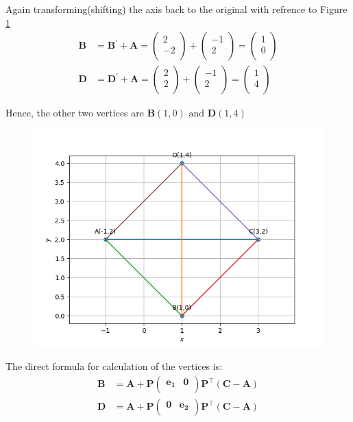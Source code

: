 \documentclass[12pt]{article}
\providecommand{\brak}[1]{\ensuremath{\left(#1\right)}}
\newcommand{\myvec}[1]{\ensuremath{\begin{pmatrix}#1\end{pmatrix}}}
\let\vec\mathbf
\begin{document}
Again transforming(shifting) the axis back to the original with refrence to Figure \ref{fig:Fig5}
\begin{align}
\vec{B} &= \vec{B^{\prime}}+\vec{A} = \myvec{
2 \\
-2\\
}+\myvec{
-1 \\
2\\
} = 
\myvec{
1 \\
0\\
}\\
\vec{D} &= \vec{D^{\prime}}+\vec{A} = \myvec{
2 \\
2\\
}+\myvec{
-1 \\
2\\
} = 
\myvec{
1 \\
4 \\
}
\end{align}

Hence, the other two vertices are $\vec{B}(1,0) \text{ and } \vec{D}(1,4)$   

\begin{figure}[!h]
	\begin{center} 
	    \includegraphics[width=\columnwidth]{figs/square4}
	\end{center}
\caption{}
\label{fig:Fig5}
\end{figure}

The direct formula for calculation of the vertices is:
\begin{align}
\vec{B} &= \vec{A} + \vec{P}\myvec{
\vec{e_{1}}&\vec{0}\\
}
\vec{P}^\top \brak{\vec{C}-\vec{A}}\\
\vec{D} &= \vec{A} + \vec{P}\myvec{
\vec{0}&\vec{e_{2}}\\
}
\vec{P}^\top \brak{\vec{C}-\vec{A}}\\
\end{align}
\end{document}
